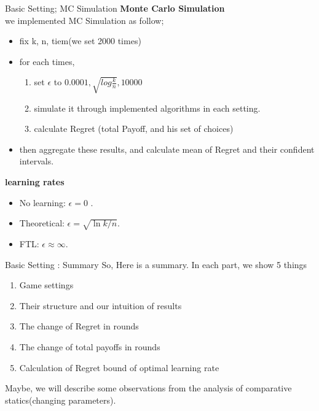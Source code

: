 \documentclass{beamer}
\begin{document}
\begin{frame}{Basic Setting; MC Simulation}
    \textbf{Monte Carlo Simulation}\\
    we implemented MC Simulation as follow;
    \begin{itemize}
        \item fix k, n, tiem(we set 2000 times)
        \item for each times, 
        \begin{enumerate}
            \item set $\epsilon$ to {$0.0001, \sqrt{log\frac{k}{n}}, 10000$}
            \item simulate it through implemented algorithms in each setting.
            \item calculate Regret (total Payoff, and his set of choices)
        \end{enumerate}
        \item then aggregate these results, and calculate mean of Regret and their confident intervals.
    \end{itemize}
    \textbf{learning rates}\\
    \begin{itemize}
      \item No learning: \(\epsilon = 0\) .
      \item Theoretical: \(\epsilon = \sqrt{\ln k / n}\).
      \item FTL:  \(\epsilon \approx \infty\).
    \end{itemize}
\end{frame}

\begin{frame}{Basic Setting : Summary}
    So, Here is a summary. In each part, we show 5 things
    \begin{enumerate}
        \item Game settings
        \item Their structure and our intuition of results
        \item The change of Regret in rounds
        \item The change of total payoffs in rounds
        \item Calculation of Regret bound of optimal learning rate
    \end{enumerate}
    Maybe, we will describe some observations from the analysis of comparative statics(changing parameters). 
\end{frame}
\end{document}
